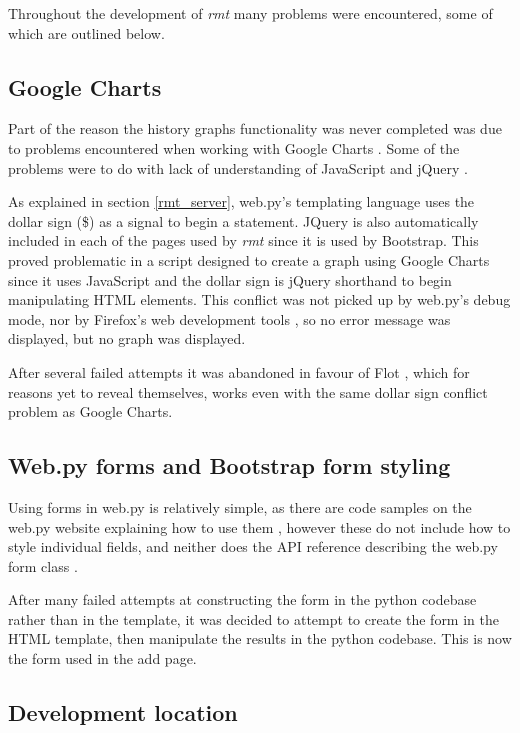 Throughout the development of \emph{rmt} many problems were encountered, some of which are outlined below.

\subsection{Google Charts}

Part of the reason the history graphs functionality was never completed was due to problems encountered when working with Google Charts \citeyearpar{googlecharts}.
Some of the problems were to do with lack of understanding of JavaScript \citep{javascript} and jQuery \citep{jquery}.

As explained in section \ref{rmt_server}, web.py's templating language uses the dollar sign (\$) as a signal to begin a statement.
JQuery is also automatically included in each of the pages used by \emph{rmt} since it is used by Bootstrap.
This proved problematic in a script designed to create a graph using Google Charts since it uses JavaScript and the dollar sign is jQuery shorthand to begin manipulating HTML elements.
This conflict was not picked up by web.py's debug mode, nor by Firefox's web development tools \citep{firefoxdevtools}, so no error message was displayed, but no graph was displayed.

After several failed attempts it was abandoned in favour of Flot \citep{flot}, which for reasons yet to reveal themselves, works even with the same dollar sign conflict problem as Google Charts.

\subsection{Web.py forms and Bootstrap form styling}

Using forms in web.py is relatively simple, as there are code samples on the web.py website explaining how to use them \citep{webpyform, webpyformfields}, however these do not include how to style individual fields, and neither does the API reference describing the web.py form class \citep{webpyformclass}.

After many failed attempts at constructing the form in the python codebase rather than in the template, it was decided to attempt to create the form in the HTML template, then manipulate the results in the python codebase.
This is now the form used in the add page.

\subsection{Development location}

